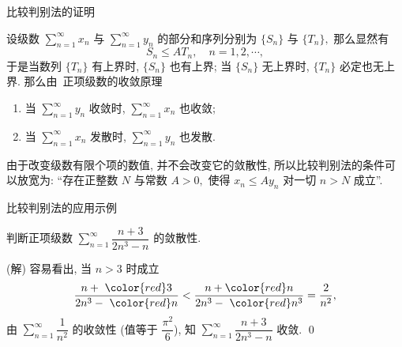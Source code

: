 \begin{frame}{比较判别法的证明}

设级数 $\sum\limits_{n=1}^\infty x_n$ 与 $\sum\limits_{n=1}^\infty y_n$ 的部分和序列分别为 $\{S_n\}$ 与 $\{T_n\},$ 那么显然有
\[S_n \leqslant AT_n, \quad n = 1, 2 ,\cdots,\]
\pause
于是当数列 $\{T_n\}$ 有上界时, $\{S_n\}$ 也有上界; 当 $\{S_n\}$ 无上界时, $\{T_n\}$ 必定也无上界. 那么由~{\color{red}正项级数的收敛原理}

\pause


\pause

\begin{enumerate}
\item[(1)] 当 $\sum\limits_{n=1}^\infty y_n$ 收敛时, $\sum\limits_{n=1}^\infty x_n$ 也收敛;
\item[(2)] 当 $\sum\limits_{n=1}^\infty x_n$ 发散时, $\sum\limits_{n=1}^\infty y_n$ 也发散.
\end{enumerate}

\pause

\begin{attnblock}
由于改变级数有限个项的数值, 并不会改变它的敛散性, 所以比较判别法的条件可以放宽为: “存在正整数 $N$ 与常数 $A>0,$ 使得 $x_n \leqslant Ay_n$ 对一切 $n > N$ 成立”.
\end{attnblock}

\end{frame}


\begin{frame}{比较判别法的应用示例}

\begin{eg}
\begin{center}
判断正项级数 $\sum\limits_{n=1}^\infty \dfrac{n+3}{2n^3-n}$ 的敛散性.
\end{center}
\end{eg}

\pause

\startproof[bg=yellow, fg=red](解)
容易看出, 当 $n > 3$ 时成立
\[\dfrac{n + ~{\color{red}3}}{2n^3 - ~ {\color{red}n}} < \dfrac{n+{\color{red}n}}{2n^3 - ~{\color{red}n^3}} = \dfrac{2}{n^2},\]
由 $\sum\limits_{n=1}^\infty \dfrac{1}{n^2}$ 的收敛性 (值等于 $\dfrac{\pi^2}{6}$), 知 $\sum\limits_{n=1}^\infty \dfrac{n+3}{2n^3-n}$ 收敛.
\qed

\end{frame}

